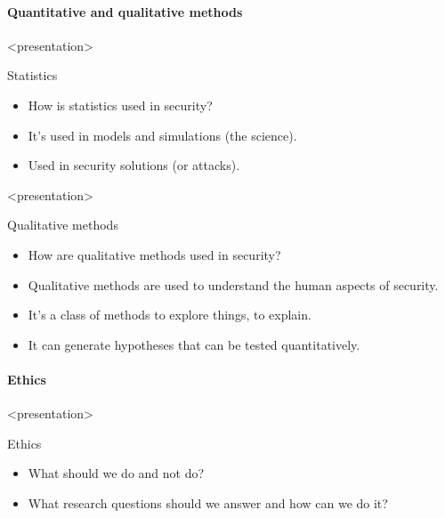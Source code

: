 \paragraph{Quantitative and qualitative methods}

\begin{frame}<presentation>
  \begin{block}{Statistics}
    \begin{itemize}
      \item How is statistics used in security?
      \item It's used in models and simulations (the science).
      \item Used in security solutions (or attacks).
    \end{itemize}
  \end{block}
\end{frame}

\begin{frame}<presentation>
  \begin{block}{Qualitative methods}
    \begin{itemize}
      \item How are qualitative methods used in security?
      \item Qualitative methods are used to understand the human aspects of 
        security.
      \item It's a class of methods to explore things, to explain.
      \item It can generate hypotheses that can be tested quantitatively.
    \end{itemize}
  \end{block}
\end{frame}

\paragraph{Ethics}

\begin{frame}<presentation>
  \begin{block}{Ethics}
    \begin{itemize}
      \item What should we do and not do?
      \item What research questions should we answer and how can we do it?
    \end{itemize}
  \end{block}
\end{frame}

